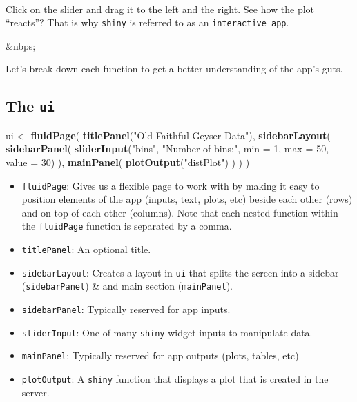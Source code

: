 \documentclass[]{book}
\newenvironment{Shaded}{\begin{snugshade}}{\end{snugshade}}
\newcommand{\DataTypeTok}[1]{\textcolor[rgb]{0.13,0.29,0.53}{#1}}
\newcommand{\DecValTok}[1]{\textcolor[rgb]{0.00,0.00,0.81}{#1}}
\newcommand{\KeywordTok}[1]{\textcolor[rgb]{0.13,0.29,0.53}{\textbf{#1}}}
\newcommand{\NormalTok}[1]{#1}
\newcommand{\StringTok}[1]{\textcolor[rgb]{0.31,0.60,0.02}{#1}}
\begin{document}
~

Click on the slider and drag it to the left and the right. See how the plot ``reacts''? That is why \texttt{shiny} is referred to as an \texttt{interactive\ app}.

\&nbps;

Let's break down each function to get a better understanding of the app's guts.

\hypertarget{the-ui}{%
\subsection*{\texorpdfstring{The \texttt{ui}}{The ui}}\label{the-ui}}

\begin{Shaded}
\begin{Highlighting}[]
\NormalTok{ui <-}\StringTok{ }\KeywordTok{fluidPage}\NormalTok{(}
    \KeywordTok{titlePanel}\NormalTok{(}\StringTok{"Old Faithful Geyser Data"}\NormalTok{),}
    \KeywordTok{sidebarLayout}\NormalTok{(}
        \KeywordTok{sidebarPanel}\NormalTok{(}
            \KeywordTok{sliderInput}\NormalTok{(}\StringTok{"bins"}\NormalTok{,}
                        \StringTok{"Number of bins:"}\NormalTok{,}
                        \DataTypeTok{min =} \DecValTok{1}\NormalTok{,}
                        \DataTypeTok{max =} \DecValTok{50}\NormalTok{,}
                        \DataTypeTok{value =} \DecValTok{30}\NormalTok{)}
\NormalTok{        ),}
        \KeywordTok{mainPanel}\NormalTok{(}
           \KeywordTok{plotOutput}\NormalTok{(}\StringTok{"distPlot"}\NormalTok{)}
\NormalTok{        )}
\NormalTok{    )}
\NormalTok{)}
\end{Highlighting}
\end{Shaded}

\begin{itemize}
\item
  \texttt{fluidPage}: Gives us a flexible page to work with by making it easy to position elements of the app (inputs, text, plots, etc) beside each other (rows) and on top of each other (columns). Note that each nested function within the \texttt{fluidPage} function is separated by a comma.
\item
  \texttt{titlePanel}: An optional title.
\item
  \texttt{sidebarLayout}: Creates a layout in \texttt{ui} that splits the screen into a sidebar (\texttt{sidebarPanel}) \& and main section (\texttt{mainPanel}).
\item
  \texttt{sidebarPanel}: Typically reserved for app inputs.
\item
  \texttt{sliderInput}: One of many \texttt{shiny} widget inputs to manipulate data.
\item
  \texttt{mainPanel}: Typically reserved for app outputs (plots, tables, etc)
\item
  \texttt{plotOutput}: A \texttt{shiny} function that displays a plot that is created in the server.
\end{itemize}
\end{document}
